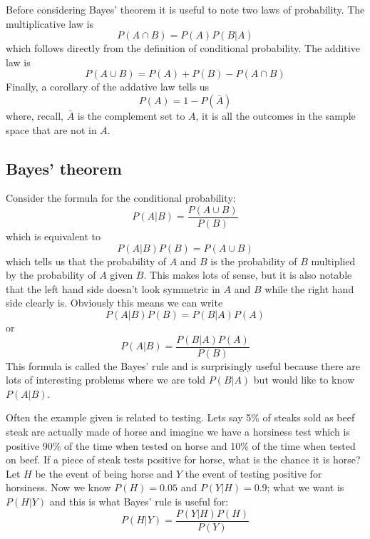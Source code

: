 \documentclass[11pt,a4paper]{scrartcl}
\begin{document}
Before considering Bayes' theorem it is useful to note two laws of probability. The multiplicative law is
\begin{equation}
P(A\cap B)=P(A)P(B|A)
\end{equation}
which follows directly from the definition of conditional probability. The additive law is
\begin{equation}
P(A\cup B)=P(A)+P(B)-P(A\cap B)
\end{equation}
Finally, a corollary of the addative law tells us
\begin{equation}
P(A)=1-P(\bar{A})
\end{equation}
where, recall, $\bar{A}$ is the complement set to $A$, it is all the
outcomes in the sample space that are not in $A$.

\subsection*{Bayes' theorem}

Consider the formula for the conditional probability:
\begin{equation}
P(A|B)=\frac{P(A\cup B)}{P(B)}
\end{equation}
which is equivalent to
\begin{equation}
P(A|B)P(B)=P(A\cup B)
\end{equation}
which tells us that the probability of $A$ and $B$ is the probability
of $B$ multiplied by the probability of $A$ given $B$. This makes lots
of sense, but it is also notable that the left hand side doesn't look
symmetric in $A$ and $B$ while the right hand side clearly is. Obviously this means we can write
\begin{equation}
P(A|B)P(B)=P(B|A)P(A)
\end{equation}
or
\begin{equation}
P(A|B)=\frac{P(B|A)P(A)}{P(B)}
\end{equation}
This formula is called the Bayes' rule and is surprisingly useful
because there are lots of interesting problems where we are told $P(B|A)$ but would like to know $P(A|B)$.

Often the example given is related to testing. Lets say 5\% of steaks
sold as beef steak are actually made of horse and imagine we have a
horsiness test which is positive 90\% of the time when tested on horse
and 10\% of the time when tested on beef. If a piece of steak tests
positive for horse, what is the chance it is horse? Let $H$ be the
event of being horse and $Y$ the event of testing positive for
horsiness. Now we know $P(H)=0.05$ and $P(Y|H)=0.9$; what we want is
$P(H|Y)$ and this is what Bayes' rule is useful for:
\begin{equation}
P(H|Y)=\frac{P(Y|H)P(H)}{P(Y)}
\end{equation}
\end{document}
